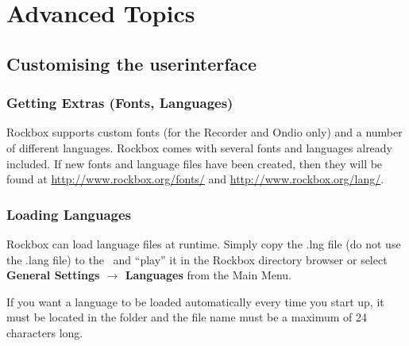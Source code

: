 \chapter{Advanced Topics}

\section{\label{ref:CustomisingUI}Customising the userinterface}
\subsection{\label{ref:GettingExtras}Getting Extras (Fonts, Languages)}
Rockbox supports custom fonts (for the Recorder and Ondio only) and a number of different languages. Rockbox comes with several fonts and languages already included. If new fonts and language files have been created, then they will be found at \url{http://www.rockbox.org/fonts/} and \url{http://www.rockbox.org/lang/}.


\subsection{\label{ref:Loadinglanguages}Loading Languages}
Rockbox can load language files at runtime. Simply copy the .lng file (do not
use the .lang file) to the \dap\ and ``play'' it in the Rockbox directory
browser or select \textbf{General Settings $\rightarrow$ Languages }from the
Main Menu.

If you want a language to be loaded automatically every time you start up, it
must be located in the \fname{/.rockbox }folder and the file name must be a
maximum of 24 characters long.

